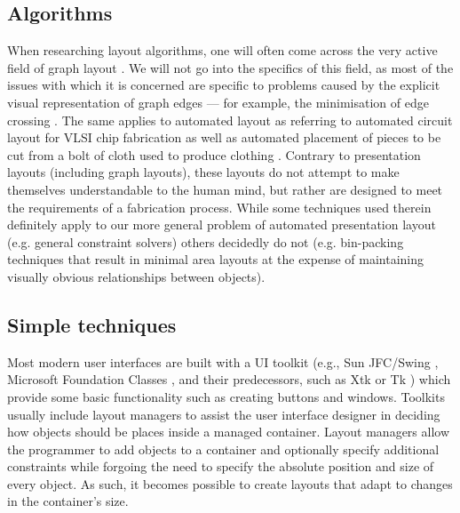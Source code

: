    \subsection{Algorithms}
    \label{related-algorithms}

    When researching layout algorithms, one will often come across the very
    active field of graph layout \citep{battista-1}. We will not go into the
    specifics of this field, as most of the issues with which it is concerned
    are specific to problems caused by the explicit visual representation of
    graph edges --- for example, the minimisation of edge crossing
    \citep{battista-2, shahrokhi-1}. The same applies to automated layout as
    referring to automated circuit layout for VLSI chip fabrication
    \citep{hu-1, lengauer-1} as well as automated placement of pieces to be cut
    from a bolt of cloth used to produce clothing \citep{milenkovic-1}.
    Contrary to presentation layouts (including graph layouts), these layouts
    do not attempt to make themselves understandable to the human mind, but
    rather are designed to meet the requirements of a fabrication process.
    While some techniques used therein definitely apply to our more general
    problem of automated presentation layout (e.g. general constraint solvers)
    others decidedly do not (e.g. bin-packing techniques \citep{hofri-1} that
    result in minimal area layouts at the expense of maintaining visually
    obvious relationships between objects).

   \subsection{Simple techniques}
    \label{simple-techniques}

    Most modern user interfaces are built with a UI toolkit (e.g., Sun
    JFC/Swing \citep{sun-1}, Microsoft Foundation Classes \citep{microsoft-1},
    and their predecessors, such as Xtk \citep{mccormack-1} or Tk
    \citep{ousterhout-1}) which provide some basic functionality such as
    creating buttons and windows. Toolkits usually include layout managers to
    assist the user interface designer in deciding how objects should be places
    inside a managed container. Layout managers allow the programmer to add
    objects to a container and optionally specify additional constraints while
    forgoing the need to specify the absolute position and size of every
    object. As such, it becomes possible to create layouts that adapt to
    changes in the container’s size.

